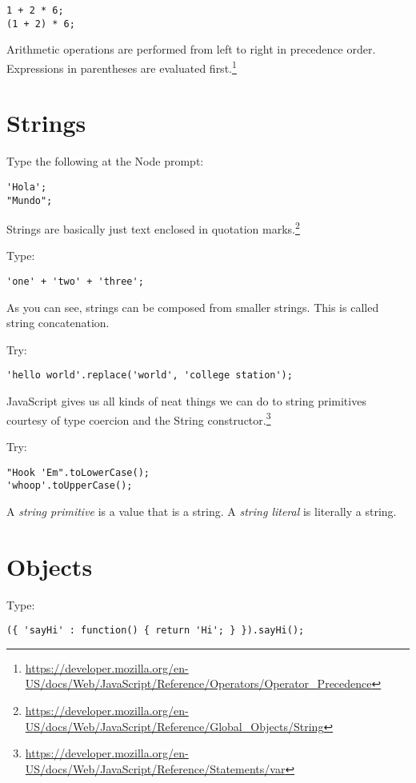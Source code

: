 \documentclass{article}
\begin{document}
\begin{lstlisting}
1 + 2 * 6;
(1 + 2) * 6;
\end{lstlisting}

Arithmetic operations are performed from left to right in precedence order. Expressions in parentheses are evaluated first.\footnote{\url{https://developer.mozilla.org/en-US/docs/Web/JavaScript/Reference/Operators/Operator_Precedence}}

\section{Strings}
Type the following at the Node prompt:

\begin{lstlisting}
'Hola';
"Mundo";
\end{lstlisting}

Strings are basically just text enclosed in quotation marks.\footnote{\url{https://developer.mozilla.org/en-US/docs/Web/JavaScript/Reference/Global_Objects/String}}

Type:
\begin{lstlisting}
'one' + 'two' + 'three';
\end{lstlisting}

As you can see, strings can be composed from smaller strings. This is called string concatenation.

Try:
\begin{lstlisting}
'hello world'.replace('world', 'college station');
\end{lstlisting}

JavaScript gives us all kinds of neat things we can do to string primitives courtesy of type coercion and the String constructor.\footnote{\url{https://developer.mozilla.org/en-US/docs/Web/JavaScript/Reference/Statements/var}}

Try:
\begin{lstlisting}
"Hook 'Em".toLowerCase();
'whoop'.toUpperCase();
\end{lstlisting}

A \emph{string primitive} is a value that is a string. A \emph{string literal} is literally \textquotedbl a string\textquotedbl. 

\section{Objects}
Type:
\begin{lstlisting}
({ 'sayHi' : function() { return 'Hi'; } }).sayHi();
\end{lstlisting}
\end{document}
